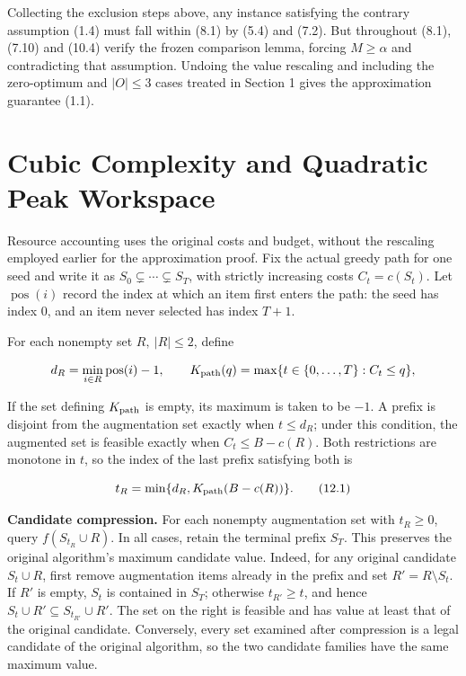 \documentclass[11pt,a4paper]{article}
\begin{document}
Collecting the exclusion steps above, any instance satisfying the contrary assumption (1.4) must fall within (8.1) by (5.4) and (7.2). But throughout (8.1), (7.10) and (10.4) verify the frozen comparison lemma, forcing $M\ge\alpha$ and contradicting that assumption. Undoing the value rescaling and including the zero-optimum and $|O|\le3$ cases treated in Section 1 gives the approximation guarantee (1.1).

\section{Cubic Complexity and Quadratic Peak Workspace}

Resource accounting uses the original costs and budget, without the rescaling employed earlier for the approximation proof. Fix the actual greedy path for one seed and write it as
$S_0\subsetneq\cdots\subsetneq S_T$, with strictly increasing costs $C_t=c(S_t)$.
Let $\operatorname{pos}(i)$ record the index at which an item first enters the path: the seed has index 0, and an item never selected has index $T+1$.

For each nonempty set $R,\ |R|\le2$, define

\[
d_R=\min_{i\in R}\operatorname{pos}(i)-1,\qquad
K_{\rm path}(q)=\max\{t\in\{0,\ldots,T\}:C_t\le q\},
\]

If the set defining $K_{\rm path}$ is empty, its maximum is taken to be $-1$. A prefix is disjoint from the augmentation set exactly when $t\le d_R$; under this condition, the augmented set is feasible exactly when $C_t\le B-c(R)$. Both restrictions are monotone in $t$, so the index of the last prefix satisfying both is

\begin{equation}
t_R=\min\{d_R,K_{\rm path}(B-c(R))\}.
\tag{12.1}
\end{equation}

\textbf{Candidate compression.} For each nonempty augmentation set with $t_R\ge0$, query $f(S_{t_R}\cup R)$. In all cases, retain the terminal prefix $S_T$. This preserves the original algorithm's maximum candidate value. Indeed, for any original candidate $S_t\cup R$, first remove augmentation items already in the prefix and set $R'=R\setminus S_t$. If $R'$ is empty, $S_t$ is contained in $S_T$; otherwise $t_{R'}\ge t$, and hence
$S_t\cup R'\subseteq S_{t_{R'}}\cup R'$. The set on the right is feasible and has value at least that of the original candidate. Conversely, every set examined after compression is a legal candidate of the original algorithm, so the two candidate families have the same maximum value.
\end{document}
